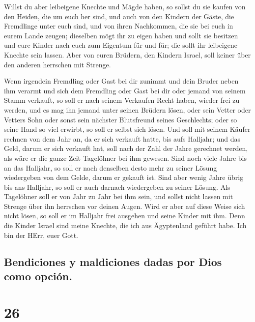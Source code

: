  Willst du aber leibeigene Knechte und Mägde haben, so
sollst du sie kaufen von den Heiden, die um euch her sind,
 und auch von den Kindern der Gäste, die Fremdlinge unter
euch sind, und von ihren Nachkommen, die sie bei euch in eurem Lande
zeugen; dieselben mögt ihr zu eigen haben  und sollt sie
besitzen und eure Kinder nach euch zum Eigentum für und für; die sollt
ihr leibeigene Knechte sein lassen. Aber von euren Brüdern, den Kindern
Israel, soll keiner über den anderen herrschen mit Strenge.

 Wenn irgendein Fremdling oder Gast bei dir zunimmt und
dein Bruder neben ihm verarmt und sich dem Fremdling oder Gast bei dir
oder jemand von seinem Stamm verkauft,  so soll er nach
seinem Verkaufen Recht haben, wieder frei zu werden, und es mag ihn
jemand unter seinen Brüdern lösen,  oder sein Vetter oder
Vetters Sohn oder sonst sein nächster Blutsfreund seines Geschlechts;
oder so seine Hand so viel erwirbt, so soll er selbst sich lösen.
 Und soll mit seinem Käufer rechnen von dem Jahr an, da
er sich verkauft hatte, bis aufs Halljahr; und das Geld, darum er sich
verkauft hat, soll nach der Zahl der Jahre gerechnet werden, als wäre er
die ganze Zeit Tagelöhner bei ihm gewesen.  Sind noch
viele Jahre bis an das Halljahr, so soll er nach denselben desto mehr zu
seiner Lösung wiedergeben von dem Gelde, darum er gekauft ist.
 Sind aber wenig Jahre übrig bis ans Halljahr, so soll er
auch darnach wiedergeben zu seiner Lösung.  Als
Tagelöhner soll er von Jahr zu Jahr bei ihm sein, und sollst nicht
lassen mit Strenge über ihn herrschen vor deinen Augen. 
Wird er aber auf diese Weise sich nicht lösen, so soll er im Halljahr
frei ausgehen und seine Kinder mit ihm.  Denn die Kinder
Israel sind meine Knechte, die ich aus Ägyptenland geführt habe. Ich bin
der HErr, euer Gott.

\hypertarget{bendiciones-y-maldiciones-dadas-por-dios-como-opciuxf3n.}{%
\subsection{Bendiciones y maldiciones dadas por Dios como
opción.}\label{bendiciones-y-maldiciones-dadas-por-dios-como-opciuxf3n.}}

\hypertarget{section-25}{%
\section{26}\label{section-25}}

